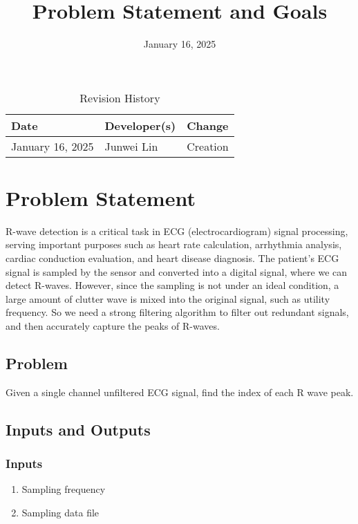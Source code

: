 \documentclass{article}
\title{Problem Statement and Goals\\\progname}
\author{\authname}
\date{January 16, 2025}
\begin{document}
\maketitle

\begin{table}[hp]
\caption{Revision History} \label{TblRevisionHistory}
\begin{tabularx}{\textwidth}{llX}
\toprule
\textbf{Date} & \textbf{Developer(s)} & \textbf{Change}\\
\midrule
January 16, 2025 & Junwei Lin & Creation\\
\bottomrule
\end{tabularx}
\end{table}

\section{Problem Statement}

R-wave detection is a critical task in ECG (electrocardiogram) signal processing, serving important purposes such as heart rate calculation, arrhythmia analysis, cardiac conduction evaluation, and heart disease diagnosis. The patient's ECG signal is sampled by the sensor and converted into a digital signal, where we can detect R-waves. However, since the sampling is not under an ideal condition, a large amount of clutter wave is mixed into the original signal, such as utility frequency. So we need a strong filtering algorithm to filter out redundant signals, and then accurately capture the peaks of R-waves.

\subsection{Problem}

Given a single channel unfiltered ECG signal, find the index of each R wave peak.

\subsection{Inputs and Outputs}

\subsubsection{Inputs}

\begin{enumerate}
    \item Sampling frequency
    \item Sampling data file
\end{enumerate}
\end{document}

